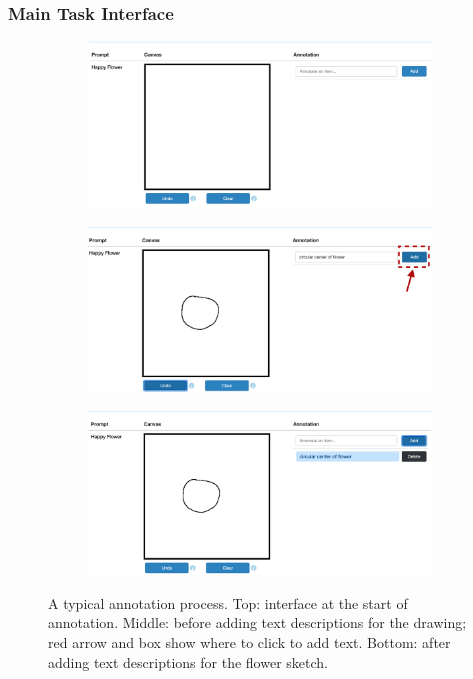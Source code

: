 \subsubsection{Main Task Interface}

\begin{figure}[!h]
\begin{subfigure}{\textwidth}
    \centering
    \includegraphics[width=.75\linewidth]{data_collection/v1_empty_table.png}  
\end{subfigure}
\newline
\begin{subfigure}{\textwidth}
    \centering
    \includegraphics[width=.75\linewidth]{data_collection/v1_before_enter_text.png}  
\end{subfigure}
\newline
\begin{subfigure}{\textwidth}
    \centering
    \includegraphics[width=.75\linewidth]{data_collection/v1_after_enter_text.png}  
\end{subfigure}
\caption{A typical annotation process. Top: interface at the start of annotation. Middle: before adding text descriptions for the drawing; red arrow and box show where to click to add text. Bottom: after adding text descriptions for the flower sketch.}
\label{v1.main_task.1}
\end{figure}

